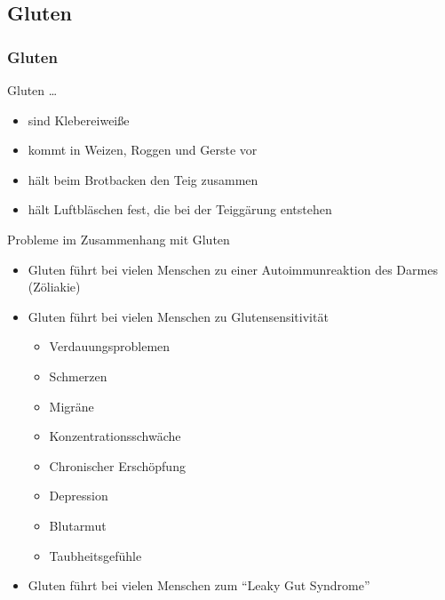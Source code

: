 \documentclass[xcolor=dvipsnames]{beamer}
\begin{document}
    \subsection{Gluten}
    \begin{frame}[allowframebreaks]
        \frametitle{Gluten}

        \begin{block}{Gluten \ldots}
            \begin{itemize}
                \setlength\itemsep{1em}
                \item sind Klebereiweiße
                \item kommt in Weizen, Roggen und Gerste vor
                \item hält beim Brotbacken den Teig zusammen
                \item hält Luftbläschen fest, die bei der Teiggärung entstehen
            \end{itemize}
        \end{block}

        \framebreak

        \begin{block}{Probleme im Zusammenhang mit Gluten}
            \begin{itemize}
                \setlength\itemsep{1em}
                \item Gluten führt bei vielen Menschen zu einer Autoimmunreaktion des Darmes (Zöliakie)
                \item Gluten führt bei vielen Menschen zu Glutensensitivität
                \begin{itemize}
                    \item Verdauungsproblemen
                    \item Schmerzen
                    \item Migräne
                    \item Konzentrationsschwäche
                    \item Chronischer Erschöpfung
                    \item Depression
                    \item Blutarmut
                    \item Taubheitsgefühle
                \end{itemize}
                \item Gluten führt bei vielen Menschen zum "`Leaky Gut Syndrome"'
            \end{itemize}
        \end{block}


\end{frame}
\end{document}
